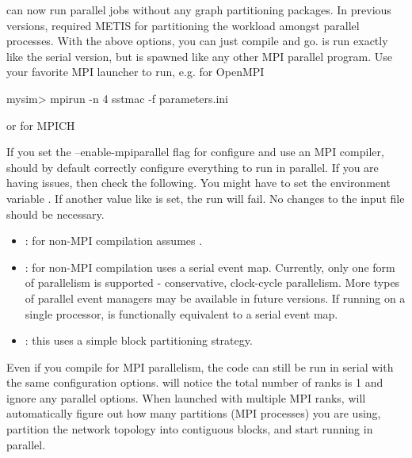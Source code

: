 \sstmacro can now run parallel jobs without any graph partitioning packages.
In previous versions, \sstmacro required METIS for partitioning the workload amongst parallel processes.
With the above options, you can just compile and go.
\sstmacro is run exactly like the serial version, but is spawned like any other MPI parallel program.
Use your favorite MPI launcher to run, e.g. for OpenMPI

\begin{ShellCmd}
mysim> mpirun -n 4 sstmac -f parameters.ini
\end{ShellCmd}

or for MPICH


If you set the --enable-mpiparallel flag for configure and use an MPI compiler,
\sstmacro should by default correctly configure everything to run in parallel.
If you are having issues, then check the following.
You might have to set the environment variable .
If another value like  is set, the run will fail.
No changes to the input file should be necessary. 
\begin{itemize}
\item {}: for non-MPI compilation \sstmacro assumes .
\item {}:  for non-MPI compilation \sstmacro uses a serial event map.  
Currently, only one form of parallelism is supported - conservative, clock-cycle parallelism.  
More types of parallel event managers may be available in future versions.
If running on a single processor,  is functionally equivalent to a serial event map.
\item {}: this uses a simple block partitioning strategy.  
\end{itemize}

Even if you compile for MPI parallelism, the code can still be run in serial with the same configuration options.
\sstmacro will notice the total number of ranks is 1 and ignore any parallel options.
When launched with multiple MPI ranks, \sstmacro will automatically figure out how many partitions (MPI processes) 
you are using, partition the network topology into contiguous blocks, and start running in parallel.   

